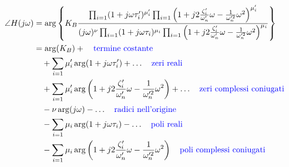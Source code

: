 \documentclass{article}
\theoremstyle{definition}
\begin{document}
\begin{align*}
	\angle H(j\omega) &= \arg \left\{ 
	K_B \frac{
		\prod_{i=1} (1 + j\omega\tau_i')^{\mu_i'} 
		\prod_{i=1} \left(1 + j2\frac{\zeta_i'}{\omega_n'}\omega - \frac{1}{\omega_n'^2}\omega^2\right)^{\mu_i'}
	}{
		(j\omega)^\nu 
		\prod_{i=1} (1 + j\omega\tau_i)^{\mu_i} 
		\prod_{i=1} \left(1 + j2\frac{\zeta_i'}{\omega_n'}\omega - \frac{1}{\omega_n'^2}\omega^2\right)^{\mu_i}
	} 
	\right\} \\
	&= \arg(K_B) +  \quad \text{\textcolor{blue}{termine costante}} \\
	&\quad + \sum_{i=1} \mu_i' \arg(1 + j\omega\tau_i') + \ldots \quad \text{\textcolor{blue}{zeri reali}}\\
	&\quad + \sum_{i=1} \mu_i' \arg\left(1 + j2\frac{\zeta_i'}{\omega_n'}\omega - \frac{1}{\omega_n'^2}\omega^2\right) + \ldots \quad \text{\textcolor{blue}{zeri complessi coniugati}} \\
	&\quad - \nu \arg(j\omega) - \ldots \quad \text{\textcolor{blue}{radici nell'origine}} \\
	&\quad - \sum_{i=1} \mu_i \arg(1 + j\omega\tau_i) - \ldots \quad \text{\textcolor{blue}{poli reali}} \\
	&\quad - \sum_{i=1} \mu_i \arg\left(1 + j2\frac{\zeta_i'}{\omega_n'}\omega - \frac{1}{\omega_n'^2}\omega^2\right) \quad\text{\textcolor{blue}{poli complessi coniugati}}
\end{align*}
\newpage 
\end{document}
